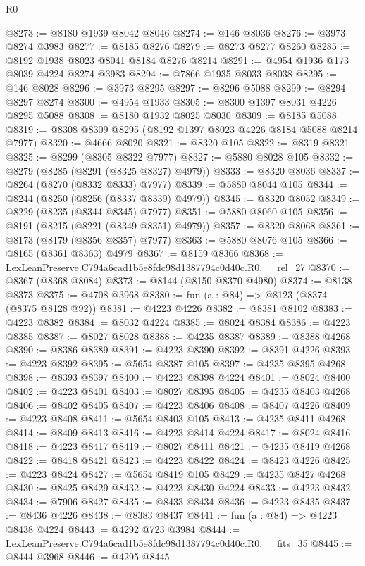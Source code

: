 \begin{lexlean}{R0}
\begin{coremodule}
@8273 := @8180 @1939 @8042 @8046
@8274 := @146 @8036
@8276 := @3973 @8274 @3983
@8277 := @8185 @8276
@8279 := @8273 @8277 @8260
@8285 := @8192 @1938 @8023 @8041 @8184 @8276 @8214
@8291 := @4954 @1936 @173 @8039 @4224 @8274 @3983
@8294 := @7866 @1935 @8033 @8038
@8295 := @146 @8028
@8296 := @3973 @8295
@8297 := @8296 @5088
@8299 := @8294 @8297 @8274
@8300 := @4954 @1933
@8305 := @8300 @1397 @8031 @4226 @8295 @5088
@8308 := @8180 @1932 @8025 @8030
@8309 := @8185 @5088
@8319 := @8308 @8309 @8295 (@8192 @1397 @8023 @4226 @8184 @5088 @8214 @7977)
@8320 := @4666 @8020
@8321 := @8320 @105
@8322 := @8319 @8321
@8325 := @8299 (@8305 @8322 @7977)
@8327 := @5880 @8028 @105
@8332 := @8279 (@8285 (@8291 (@8325 @8327) @4979))
@8333 := @8320 @8036
@8337 := @8264 (@8270 (@8332 @8333) @7977)
@8339 := @5880 @8044 @105
@8344 := @8244 (@8250 (@8256 (@8337 @8339) @4979))
@8345 := @8320 @8052
@8349 := @8229 (@8235 (@8344 @8345) @7977)
@8351 := @5880 @8060 @105
@8356 := @8191 (@8215 (@8221 (@8349 @8351) @4979))
@8357 := @8320 @8068
@8361 := @8173 (@8179 (@8356 @8357) @7977)
@8363 := @5880 @8076 @105
@8366 := @8165 (@8361 @8363) @4979
@8367 := @8159 @8366
@8368 := LexLeanPreserve.C794a6cad1b5e8fdc98d1387794c0d40c.R0.__rel_27
@8370 := @8367 (@8368 @8084)
@8373 := @8144 (@8150 @8370 @4980)
@8374 := @8138 @8373
@8375 := @4708 @3968
@8380 := fun (a : @84) => @8123 (@8374 (@8375 @8128 @92))
@8381 := @4223 @4226
@8382 := @8381 @8102
@8383 := @4223 @8382
@8384 := @8032 @4224
@8385 := @8024 @8384
@8386 := @4223 @8385
@8387 := @8027 @8028
@8388 := @4235 @8387
@8389 := @8388 @4268
@8390 := @8386 @8389
@8391 := @4223 @8390
@8392 := @8391 @4226
@8393 := @4223 @8392
@8395 := @5654 @8387 @105
@8397 := @4235 @8395 @4268
@8398 := @8393 @8397
@8400 := @4223 @8398 @4224
@8401 := @8024 @8400
@8402 := @4223 @8401
@8403 := @8027 @8395
@8405 := @4235 @8403 @4268
@8406 := @8402 @8405
@8407 := @4223 @8406
@8408 := @8407 @4226
@8409 := @4223 @8408
@8411 := @5654 @8403 @105
@8413 := @4235 @8411 @4268
@8414 := @8409 @8413
@8416 := @4223 @8414 @4224
@8417 := @8024 @8416
@8418 := @4223 @8417
@8419 := @8027 @8411
@8421 := @4235 @8419 @4268
@8422 := @8418 @8421
@8423 := @4223 @8422
@8424 := @8423 @4226
@8425 := @4223 @8424
@8427 := @5654 @8419 @105
@8429 := @4235 @8427 @4268
@8430 := @8425 @8429
@8432 := @4223 @8430 @4224
@8433 := @4223 @8432
@8434 := @7906 @8427
@8435 := @8433 @8434
@8436 := @4223 @8435
@8437 := @8436 @4226
@8438 := @8383 @8437
@8441 := fun (a : @84) => @4223 @8438 @4224
@8443 := @4292 @723 @3984
@8444 := LexLeanPreserve.C794a6cad1b5e8fdc98d1387794c0d40c.R0.__fits_35
@8445 := @8444 @3968
@8446 := @4295 @8445

\end{coremodule}
\end{lexlean}
